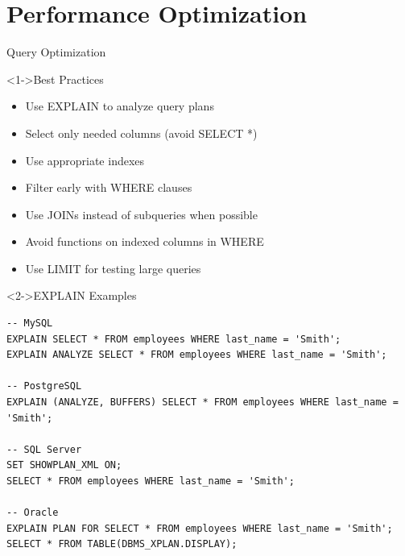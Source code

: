 \documentclass[aspectratio=169,11pt]{beamer}
\begin{document}
\section{Performance Optimization}

\begin{frame}[fragile]{Query Optimization}
\begin{block}<1->{Best Practices}
\begin{itemize}
    \item Use EXPLAIN to analyze query plans
    \item Select only needed columns (avoid SELECT *)
    \item Use appropriate indexes
    \item Filter early with WHERE clauses
    \item Use JOINs instead of subqueries when possible
    \item Avoid functions on indexed columns in WHERE
    \item Use LIMIT for testing large queries
\end{itemize}
\end{block}

\pause
\begin{exampleblock}<2->{EXPLAIN Examples}
\begin{lstlisting}
-- MySQL
EXPLAIN SELECT * FROM employees WHERE last_name = 'Smith';
EXPLAIN ANALYZE SELECT * FROM employees WHERE last_name = 'Smith';

-- PostgreSQL
EXPLAIN (ANALYZE, BUFFERS) SELECT * FROM employees WHERE last_name = 'Smith';

-- SQL Server
SET SHOWPLAN_XML ON;
SELECT * FROM employees WHERE last_name = 'Smith';

-- Oracle
EXPLAIN PLAN FOR SELECT * FROM employees WHERE last_name = 'Smith';
SELECT * FROM TABLE(DBMS_XPLAN.DISPLAY);
\end{lstlisting}
\end{exampleblock}
\end{frame}
\end{document}
